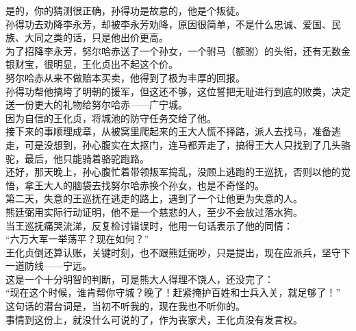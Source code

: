 \begin{multicols}{\theparacolNo}
是的，你的猜测很正确，孙得功是故意的，他是个叛徒。\\

孙得功去劝降李永芳，却被李永芳劝降，原因很简单，不是什么忠诚、爱国、民族、大同之类的话，只是他出价更高。\\

为了招降李永芳，努尔哈赤送了一个孙女，一个驸马（额驸）的头衔，还有无数金银财宝，很明显，王化贞出不起这个价。\\

努尔哈赤从来不做赔本买卖，他得到了极为丰厚的回报。\\

孙得功帮他搞垮了明朝的援军，但这还不够，这位誓把无耻进行到底的败类，决定送一份更大的礼物给努尔哈赤——广宁城。\\

因为自信的王化贞，将城池的防守任务交给了他。\\

接下来的事顺理成章，从被窝里爬起来的王大人慌不择路，派人去找马，准备逃走，可是没想到，孙心腹实在太抠门，连马都弄走了，搞得王大人只找到了几头骆驼，最后，他只能骑着骆驼跑路。\\

还好，那天晚上，孙心腹忙着带领叛军捣乱，没顾上逃跑的王巡抚，否则以他的觉悟，拿王大人的脑袋去找努尔哈赤换个孙女，也是不奇怪的。\\

第二天，失意的王巡抚在逃走的路上，遇到了一个让他更为失意的人。\\

熊廷弼用实际行动证明，他不是一个慈悲的人，至少不会放过落水狗。\\

当王巡抚痛哭流涕，反复检讨错误时，他用一句话表示了他的同情：\\

“六万大军一举荡平？现在如何？”\\

王化贞倒还算认账，关键时刻，也不跟熊廷弼吵，只是提出，现在应派兵，坚守下一道防线——宁远。\\

这是一个十分明智的判断，可是熊大人得理不饶人，还没完了：\\

“现在这个时候，谁肯帮你守城？晚了！赶紧掩护百姓和士兵入关，就足够了！”\\

这句话的潜台词是，当初不听我的，现在我也不听你的。\\

事情到这份上，就没什么可说的了，作为丧家犬，王化贞没有发言权。\\


\end{multicols}
